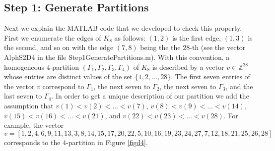 \documentclass[reqno,11pt]{amsart}
\theoremstyle{definition}
\theoremstyle{remark}
\numberwithin{equation}{section}
\begin{document}
\subsection{Step 1: Generate Partitions}
Next we explain the MATLAB code that we developed to check this property. First we enumerate the edges of $K_8$ as follows: $(1,2)$ is the first edge, $(1,3)$ is the second, and so on with the edge $(7,8)$ being the  the $28$-th  (see the vector {\ttfamily AlphS2D4} in the file {\ttfamily  Step1GeneratePartitions.m}). With this convention, a homogeneous $4$-partition  $(\Gamma_1,\Gamma_2,\Gamma_3,\Gamma_4)$ of $K_8$ is described by a vector $v\in \mathbb{Z}^{28}$ whose entries are distinct values of the set $\{1,2,\dots,28\}$. The first seven entries of the vector $v$ correspond to $\Gamma_1$, the next seven to $\Gamma_2$, the next seven to $\Gamma_3$, and the last seven to $\Gamma_4$. In order to get a unique description of our partition we add the assumption that  $v(1)<v(2)<\dots<v(7)$, $v(8)<v(9)<\dots<v(14)$, $v(15)<v(16)<\dots<v(21)$, 
 and $v(22)<v(23)<\dots<v(28)$. 
For example,  the vector 
$$v=[1,2,4,6,9,11,13,3,8,14,15,17,20,22,5,10,16,19,23,24,27,7,12,18,21,25,26,28]$$ corresponds to the $4$-partition in Figure \ref{figd4}.
\end{document}
